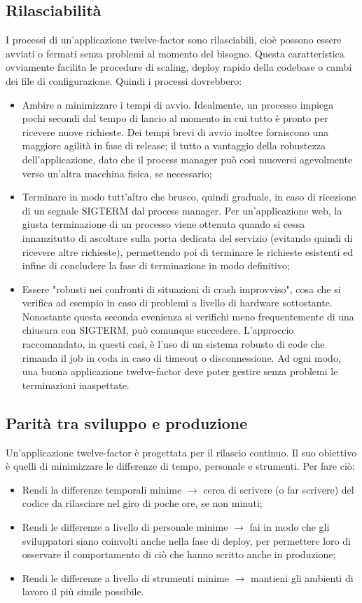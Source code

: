 \documentclass[PianoDiQualifica.tex]{subfiles}
\begin{document}
\subsection{Rilasciabilità}
I processi di un'applicazione twelve-factor sono rilasciabili, cioè possono essere avviati o fermati senza problemi al momento del bisogno. Questa caratteristica ovviamente facilita le procedure di scaling, deploy rapido della codebase o cambi dei file di configurazione.
Quindi i processi dovrebbero:
\begin{itemize}
\item Ambire a minimizzare i tempi di avvio. Idealmente, un processo impiega pochi secondi dal tempo di lancio al momento in cui tutto è pronto per ricevere nuove richieste. Dei tempi brevi di avvio inoltre forniscono una maggiore agilità in fase di release; il tutto a vantaggio della robustezza dell'applicazione, dato che il process manager può così muoversi agevolmente verso un'altra macchina fisica, se necessario;
\item Terminare in modo tutt'altro che brusco, quindi graduale, in caso di ricezione di un segnale SIGTERM dal process manager. Per un'applicazione web, la giusta terminazione di un processo viene ottenuta quando si cessa innanzitutto di ascoltare sulla porta dedicata del servizio (evitando quindi di ricevere altre richieste), permettendo poi di terminare le richieste esistenti ed infine di concludere la fase di terminazione in modo definitivo;
\item Essere "robusti nei confronti di situazioni di crash improvviso", cosa che si verifica ad esempio in caso di problemi a livello di hardware sottostante. Nonostante questa seconda evenienza si verifichi meno frequentemente di una chiusura con SIGTERM, può comunque succedere. L'approccio raccomandato, in questi casi, è l'uso di un sistema robusto di code che rimanda il job in coda in caso di timeout o disconnessione. Ad ogni modo, una buona applicazione twelve-factor deve poter gestire senza problemi le terminazioni inaspettate.
\end{itemize}

\subsection{Parità tra sviluppo e produzione}
Un'applicazione twelve-factor è progettata per il rilascio continuo. Il suo obiettivo è quelli di minimizzare le differenze di tempo, personale e strumenti.
Per fare ciò:
\begin{itemize}
\item Rendi la differenze temporali minime $\rightarrow$ cerca di scrivere (o far scrivere) del codice da rilasciare nel giro di poche ore, se non minuti;
\item Rendi le differenze a livello di personale minime $\rightarrow$ fai in modo che gli sviluppatori siano coinvolti anche nella fase di deploy, per permettere loro di osservare il comportamento di ciò che hanno scritto anche in produzione;
\item Rendi le differenze a livello di strumenti minime $\rightarrow$ mantieni gli ambienti di lavoro il più simile possibile.
\end{itemize}
\end{document}
